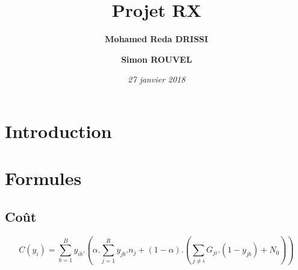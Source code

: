 \documentclass[a4paper,sans,titlepage,10pt]{article}
\title{Projet RX}
\author { \textbf{Mohamed Reda DRISSI }
			\and
		   \textbf{Simon ROUVEL}}
\date{\textit{27 janvier 2018}}
\begin{document}
\maketitle

\tableofcontents
\clearpage
\section{Introduction}
\section{Formules}
\subsection{Coût}
\begin{displaymath}
C(y_i)= \sum_{b=1}^By_{ib}.\left(\alpha.\sum_{j=1}^Ry_{jb}.n_j+(1-\alpha).(\sum_{j\neq i}G_{ji}.(1-y_{jb})+N_0)\right)
\end{displaymath}
\end{document}
